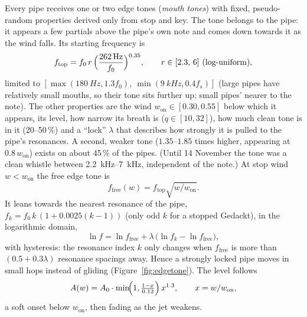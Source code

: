 \documentclass[11pt,a4paper,parskip=half,DIV=11,toc=bibliography]{scrartcl}
\begin{document}
Every pipe receives one or two edge tones (\emph{mouth tones}) with fixed, pseudo-random properties derived only from stop
and key. The tone belongs to the pipe: it appears a few partials above the pipe's own note and comes down towards it as the
wind falls. Its starting frequency is
\begin{equation}
  f_\text{top} = f_0\,r\,\Bigl(\frac{\SI{262}{Hz}}{f_0}\Bigr)^{0.35},\qquad r\in[2.3,\,6]\ \text{(log-uniform)},
\end{equation}
limited to $[\max(\SI{180}{Hz},1.3f_0),\ \min(\SI{9}{kHz},0.4f_s)]$ (large pipes have relatively small mouths, so their tone sits
further up; small pipes' nearer to the note). The other properties are the wind $w_\text{on}\in[0.30,0.55]$ below which
it appears, its level, how narrow its breath is ($q\in[10,32]$), how much clean tone is in it (20--50\,\%) and a
\enquote{lock} $\lambda$ that describes how strongly it is pulled to the pipe's
resonances. A second, weaker tone ($1.35$--$1.85$ times higher, appearing at $0.8\,w_\text{on}$) exists on about 45\,\% of the pipes.
(Until 14 November the tone was a clean whistle between \SIrange{2.2}{7}{kHz}, independent of the note.) At stop wind
$w<w_\text{on}$ the free edge tone is
\begin{equation}
  f_\text{free}(w) = f_\text{top}\sqrt{w/w_\text{on}} .
\end{equation}
It leans towards the nearest resonance of the pipe, $f_k = f_0\,k\,(1+0.0025(k-1))$ (only odd $k$ for a
stopped Gedackt), in the logarithmic domain,
\begin{equation}
  \ln f = \ln f_\text{free} + \lambda\,\bigl(\ln f_k - \ln f_\text{free}\bigr),
\end{equation}
with hysteresis: the resonance index $k$ only changes when $f_\text{free}$ is more than
$(0.5+0.3\lambda)$ resonance spacings away. Hence a strongly locked pipe moves in small hops instead of
gliding (Figure~\ref{fig:edgetone}). The level follows
\begin{equation}
  A(w) = A_0\cdot\min\!\Bigl(1,\tfrac{1-x}{0.12}\Bigr)\,x^{1.3},\qquad x = w/w_\text{on},
\end{equation}
a soft onset below $w_\text{on}$, then fading as the jet weakens.
\end{document}
